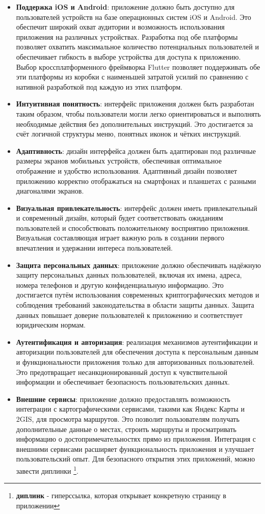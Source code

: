 \begin{itemize}
    \item \textbf{Поддержка iOS и Android}: приложение должно быть доступно для пользователей устройств на базе операционных систем iOS и Android. Это обеспечит широкий охват аудитории и возможность использования приложения на различных устройствах. Разработка под обе платформы позволяет охватить максимальное количество потенциальных пользователей и обеспечивает гибкость в выборе устройства для доступа к приложению. Выбор кроссплатформенного фреймворка Flutter позволяет поддерживать обе эти платформы из коробки с наименьшей затратой усилий по сравнению с нативной разработкой под каждую из этих платформ.
    \item \textbf{Интуитивная понятность}: интерфейс приложения должен быть разработан таким образом, чтобы пользователи могли легко ориентироваться и выполнять необходимые действия без дополнительных инструкций. Это достигается за счёт логичной структуры меню, понятных иконок и чётких инструкций.
    \item \textbf{Адаптивность}: дизайн интерфейса должен быть адаптирован под различные размеры экранов мобильных устройств, обеспечивая оптимальное отображение и удобство использования. Адаптивный дизайн позволяет приложению корректно отображаться на смартфонах и планшетах с разными диагоналями экранов.
    \item \textbf{Визуальная привлекательность}: интерфейс должен иметь привлекательный и современный дизайн, который будет соответствовать ожиданиям пользователей и способствовать положительному восприятию приложения. Визуальная составляющая играет важную роль в создании первого впечатления и удержании интереса пользователей.
    \item \textbf{Защита персональных данных}: приложение должно обеспечивать надёжную защиту персональных данных пользователей, включая их имена, адреса, номера телефонов и другую конфиденциальную информацию. Это достигается путём использования современных криптографических методов и соблюдения требований законодательства в области защиты данных. Защита данных повышает доверие пользователей к приложению и соответствует юридическим нормам.
    \item \textbf{Аутентификация и авторизация}: реализация механизмов аутентификации и авторизации пользователей для обеспечения доступа к персональным данным и функциональности приложения только для авторизованных пользователей. Это предотвращает несанкционированный доступ к чувствительной информации и обеспечивает безопасность пользовательских данных.
    \item \textbf{Внешние сервисы}: приложение должно предоставлять возможность интеграции с картографическими сервисами, такими как Яндекс Карты и 2GIS, для просмотра маршрутов. Это позволит пользователям получать дополнительные данные о местах, строить маршруты и просматривать информацию о достопримечательностях прямо из приложения. Интеграция с внешними сервисами расширяет функциональность приложения и улучшает пользовательский опыт. Для безопасного открытия этих приложений, можно завести диплинки \footnote[0]{\textbf{диплинк} - гиперссылка, которая открывает конкретную страницу в приложении}.
\end{itemize}
